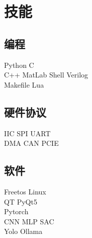 \documentclass[]{deedy-resume-openfont}
\begin{document}
\begin{minipage}[t]{0.25\textwidth}
\section{技能}
\sectionsep
\subsection{编程}
Python \textbullet{} C \\
C++ \textbullet{} MatLab \textbullet{} Shell \textbullet{} Verilog \\
Makefile \textbullet{} Lua \\ 
\sectionsep

\subsection{硬件协议}
IIC \textbullet{} SPI \textbullet{} UART \\
DMA \textbullet{} CAN \textbullet{} PCIE \\
\sectionsep

\subsection{软件}
Freetos \textbullet{} Linux\\
QT \textbullet{} PyQt5 \\
Pytorch \\
CNN \textbullet{} MLP \textbullet{} SAC\\
Yolo \textbullet{} Ollama \\
\sectionsep


\end{minipage}
\end{document}
